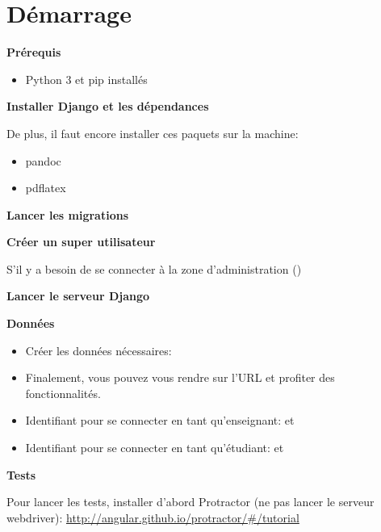 \documentclass[a4paper,10pt,twoside]{sphinxmanual}
\begin{document}
\chapter{Démarrage}
\label{start::doc}\label{start:demarrage}
\textbf{Prérequis}
\begin{itemize}
\item {} 
Python 3 et pip installés

\end{itemize}

\textbf{Installer Django et les dépendances}


De plus, il faut encore installer ces paquets sur la machine:
\begin{itemize}
\item {} 
pandoc

\item {} 
pdflatex

\end{itemize}

\textbf{Lancer les migrations}


\textbf{Créer un super utilisateur}

S'il y a besoin de se connecter à la zone d'administration ()


\textbf{Lancer le serveur Django}


\textbf{Données}
\begin{itemize}
\item {} 
Créer les données nécessaires: 

\item {} 
Finalement, vous pouvez vous rendre sur l'URL  et profiter des fonctionnalités.

\item {} 
Identifiant pour se connecter en tant qu'enseignant:  et 

\item {} 
Identifiant pour se connecter en tant qu'étudiant:  et 

\end{itemize}

\textbf{Tests}

Pour lancer les tests, installer d'abord Protractor (ne pas lancer le serveur webdriver): \href{http://angular.github.io/protractor/\#/tutorial}{http://angular.github.io/protractor/\#/tutorial}
\end{document}
